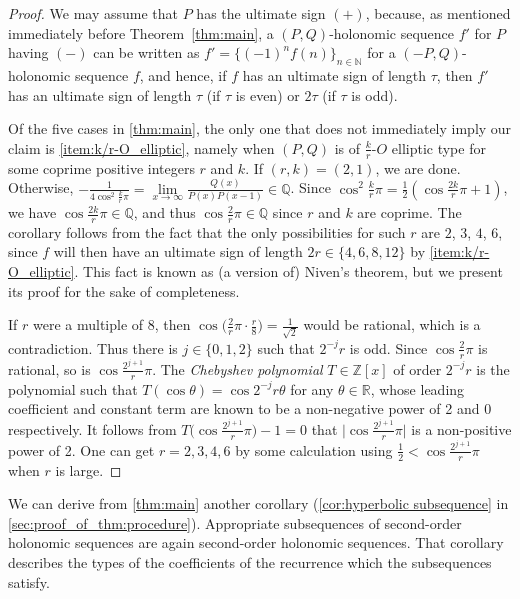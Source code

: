 \documentclass[a4paper,UKenglish,cleveref,autoref,thm-restate]{lipics-v2021}
\newcommand{\R}{\mathbb{R}}
\newcommand{\N}{\mathbb{N}}
\newcommand{\Q}{\mathbb{Q}}
\newcommand{\Z}{\mathbb{Z}}
\begin{document}
\begin{proof}
We may assume that $P$ has the ultimate sign $(+)$, because, 
as mentioned immediately before Theorem~\ref{thm:main}, 
a $(P, Q)$-holonomic sequence $f'$ for $P$ having $(-)$
can be written as 
$f' = \{ (-1)^n f(n) \}_{n \in \N}$
for a $(-P, Q)$-holonomic sequence $f$, 
and hence, 
if $f$ has an ultimate sign of length $\tau$, 
then $f'$ has an ultimate sign of length $\tau$ (if $\tau$ is even) or $2 \tau$ (if $\tau$ is odd).

Of the five cases in \cref{thm:main}, 
the only one that does not immediately imply our claim 
is \eqref{item:k/r-O_elliptic}, 
namely when 
$(P, Q)$ is of $\frac{k}r$-$O$ elliptic type for some coprime positive integers $r$ and $k$.
If $(r, k) = (2, 1)$, we are done. 
Otherwise, $-\frac1{4 \cos^2 \frac{k}r \pi} = \lim\limits_{x \to \infty} \frac{Q(x)}{P(x)P(x-1)} \in \Q$. 
Since $\cos^2 \frac{k}r \pi = \frac12 \left( \cos \frac{2k}r \pi +1 \right)$, 
we have $\cos \frac{2k}r \pi \in \Q$, 
and thus $\cos \frac{2}r \pi \in \Q$ since $r$ and $k$ are coprime. 
The corollary follows from the fact that  
the only possibilities for such $r$ are $2$, $3$, $4$, $6$, 
since $f$ will then have an ultimate sign of length $2r \in \{ 4, 6, 8, 12\}$
by \eqref{item:k/r-O_elliptic}. 
This fact is known as (a version of) Niven's theorem, 
but we present its proof for the sake of completeness. 

If $r$ were a multiple of $8$, then $\cos \bigl( \frac2r \pi \cdot \frac{r}8 \bigr) = \frac1{\sqrt{2}}$ would be rational, which is a contradiction. 
Thus there is $j \in \{ 0, 1, 2 \}$ such that $2^{-j} r$ is odd. 
Since $\cos \frac2r \pi$ is rational, so is $\cos \frac{2^{j+1}}r \pi$. 
The \emph{Chebyshev polynomial} $T \in \Z[x]$ of order $2^{-j} r$ is the polynomial such that $T(\cos \theta) = \cos 2^{-j} r \theta$ for any $\theta \in \R$, whose leading coefficient and constant term are known to be a non-negative power of 2 and $0$ respectively. It follows from $T\bigl( \cos \frac{2^{j+1}}r \pi \bigr) - 1 = 0$ that $\bigl| \cos \frac{2^{j+1}}r \pi \bigr|$ is a non-positive power of 2. One can get $r = 2, 3, 4, 6$ by some calculation using $\frac12 < \cos \frac{2^{j+1}}r \pi$ when $r$ is large. 
\end{proof}

We can derive from \cref{thm:main} another corollary (\cref{cor:hyperbolic subsequence} in \cref{sec:proof_of_thm:procedure}). Appropriate subsequences of second-order holonomic sequences are again second-order holonomic sequences. That corollary describes the types of the coefficients of the recurrence which the subsequences satisfy. 
\end{document}
